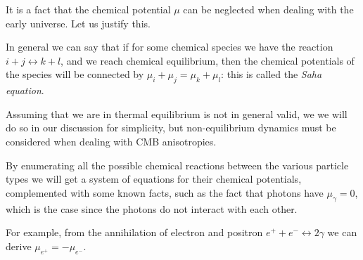 \documentclass[main.tex]{subfiles}
\begin{document}
It is a fact that the chemical potential \(\mu \) can be neglected when dealing with the early universe. Let us justify this.

In general we can say that if for some chemical species we have the reaction \(i+j \leftrightarrow k+l\), and we reach chemical equilibrium, then the chemical potentials of the species will be connected by \(\mu _i + \mu _j = \mu _k + \mu _l\): this is called the \emph{Saha equation}.

Assuming that we are in thermal equilibrium is not in general valid, we we will do so in our discussion for simplicity, but non-equilibrium dynamics must be considered when dealing with CMB anisotropies.

By enumerating all the possible chemical reactions between the various particle types we will get a system of equations for their chemical potentials, complemented with some known facts, such as the fact that photons have \(\mu_{\gamma }=0\), which is the case since the photons do not interact with each other.

For example, from the annihilation of electron and positron \(e^{+}+ e^{-} \leftrightarrow 2 \gamma \) we can derive \(\mu _{e^{+}} = - \mu_{e^{-}}\).

\end{document}
